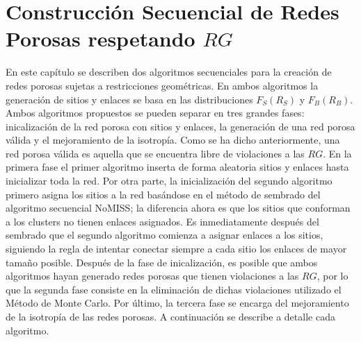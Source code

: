 \chapter{Construcción Secuencial de Redes Porosas respetando $RG$}
\label{champ:BSGR}
\bigskip
\barra
\bigskip



En este capítulo se describen dos algoritmos secuenciales para la creación de redes porosas sujetas a restricciones geométricas. 
En ambos algoritmos la generación de sitios y enlaces se basa en las distribuciones $F_S(R_S)$ y $F_B(R_B)$. Ambos algoritmos propuestos 
se pueden separar en tres grandes fases: inicalizaci\'on de la red porosa con sitios y enlaces, la generación de una red porosa v\'alida y
el mejoramiento de la isotrop\'ia. 
Como se ha dicho anteriormente, una red porosa v\'alida es aquella que se encuentra libre de violaciones a las $RG$. En la primera fase 
el primer algoritmo inserta de forma aleatoria sitios y enlaces hasta inicializar toda la red. Por otra parte, la inicialización del segundo 
algoritmo primero asigna los sitios a la red basándose en el método de sembrado del algoritmo secuencial NoMISS; la diferencia ahora es que 
los sitios que conforman a los clusters no tienen enlaces asignados. Es inmediatamente después del sembrado que el segundo algoritmo comienza 
a asignar enlaces a los sitios, siguiendo la regla de intentar conectar siempre a cada sitio los enlaces de mayor tamaño posible. 
Después de la fase de inicalizaci\'on, es posible que ambos algoritmos hayan generado redes porosas que tienen violaciones a las $RG$, por lo que 
la segunda fase consiste en la eliminaci\'on de dichas violaciones utilizado el Método de Monte Carlo. Por \'ultimo, la tercera fase se 
encarga del mejoramiento de la isotrop\'ia de las redes porosas. A continuación 
se describe a detalle cada algoritmo. 


